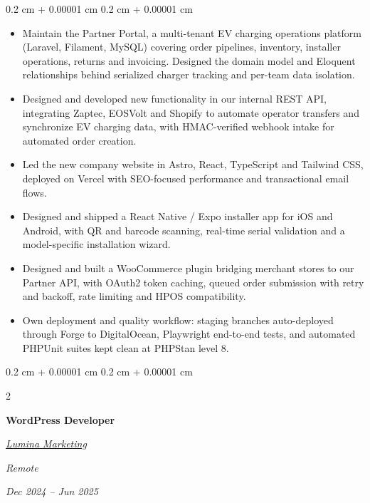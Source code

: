 \documentclass[10pt, letterpaper]{article}
\newenvironment{highlights}{
    \begin{itemize}[
        topsep=0.10 cm,
        parsep=0.10 cm,
        partopsep=0pt,
        itemsep=0pt,
        leftmargin=0.4 cm + 10pt
    ]
}{
    \end{itemize}
} %
\newenvironment{onecolentry}{
    \begin{adjustwidth}{
        0.2 cm + 0.00001 cm
    }{
        0.2 cm + 0.00001 cm
    }
}{
    \end{adjustwidth}
} %
\newenvironment{twocolentry}[2][]{
    \onecolentry
    \def\secondColumn{#2}
    \setcolumnwidth{\fill, 4.5 cm}
    \begin{paracol}{2}
}{
    \switchcolumn \raggedleft \secondColumn
    \end{paracol}
    \endonecolentry
} %
\let\hrefWithoutArrow\href
\renewcommand{\href}[2]{\hrefWithoutArrow{#1}{\ifthenelse{\equal{#2}{}}{ }{#2 }\raisebox{.15ex}{\footnotesize \faExternalLink*}}}
\begin{document}
        \vspace{0.10 cm}

        \begin{onecolentry}
            \begin{highlights}
                \item Maintain the Partner Portal, a multi-tenant EV charging operations platform (Laravel, Filament, MySQL) covering order pipelines, inventory, installer operations, returns and invoicing. Designed the domain model and Eloquent relationships behind serialized charger tracking and per-team data isolation.
                \item Designed and developed new functionality in our internal REST API, integrating Zaptec, EOSVolt and Shopify to automate operator transfers and synchronize EV charging data, with HMAC-verified webhook intake for automated order creation.
                \item Led the new company website in Astro, React, TypeScript and Tailwind CSS, deployed on Vercel with SEO-focused performance and transactional email flows.
                \item Designed and shipped a React Native / Expo installer app for iOS and Android, with QR and barcode scanning, real-time serial validation and a model-specific installation wizard.
                \item Designed and built a WooCommerce plugin bridging merchant stores to our Partner API, with OAuth2 token caching, queued order submission with retry and backoff, rate limiting and HPOS compatibility.
                \item Own deployment and quality workflow: staging branches auto-deployed through Forge to DigitalOcean, Playwright end-to-end tests, and automated PHPUnit suites kept clean at PHPStan level 8.
            \end{highlights}
        \end{onecolentry}

        \vspace{0.30 cm}

        \begin{twocolentry}{
            \textit{Remote}

            \textit{Dec 2024 – Jun 2025}}
            \textbf{WordPress Developer}

            \hrefWithoutArrow{https://newlumina.com/} {\color{black} \hspace*{0.13cm}\textit{Lumina Marketing}}
        \end{twocolentry}
\end{document}
